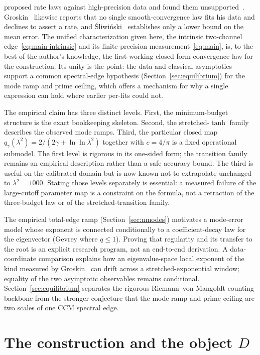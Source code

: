\documentclass[11pt,a4paper]{article}
\begin{document}
\begin{enumerate}
  proposed rate laws against high-precision data and found them
  unsupported~\cite{AndrewsB}. Groskin~\cite{Groskin2026} likewise reports
  that no single smooth-convergence law fits his data and declines to assert a
  rate, and \'Sliwi\'nski~\cite{Sliwinski2026} establishes only a lower bound
  on the mean error. The unified characterization given here, the intrinsic
  two-channel edge~\eqref{eq:main-intrinsic} and its finite-precision
  measurement~\eqref{eq:main}, is, to the best of the author's knowledge, the
  first working closed-form convergence law for the construction. Its unity is
  the point: the data and classical asymptotics support a common spectral-edge
  hypothesis (Section~\ref{sec:equilibrium}) for the mode ramp and prime
  ceiling, which offers a mechanism for why a single expression can hold where
  earlier per-fits could not.
\end{enumerate}

The empirical claim has three distinct levels. First, the minimum-budget
structure is the exact bookkeeping skeleton. Second, the stretched-$\tanh$
family describes the observed mode ramps. Third, the particular closed map
$q_\gamma(\lambda^2)=2/(2\gamma+\ln\ln\lambda^2)$ together with
$c=4/\pi$ is a fixed operational submodel. The first level is rigorous in its one-sided form; the transition family
remains an empirical description rather than a safe accuracy bound. The
third is useful on the calibrated domain but
is now known not to extrapolate unchanged to $\lambda^2=1000$. Stating those
levels separately is essential: a measured failure of the large-cutoff
parameter map is a constraint on the formula, not a retraction of the
three-budget law or of the stretched-transition family.

The empirical total-edge ramp (Section~\ref{sec:nmodes}) motivates a
mode-error model whose exponent is connected conditionally to a
coefficient-decay law for the eigenvector (Gevrey where $q\le1$). Proving that
regularity and its transfer to the
root is an explicit research program, not an end-to-end derivation. A
data-coordinate comparison explains how an eigenvalue-space local exponent of
the kind measured by Groskin~\cite{Groskin2026} can drift across a
stretched-exponential window; equality of the two asymptotic observables remains
conditional. Section~\ref{sec:equilibrium}
separates the rigorous Riemann--von Mangoldt counting backbone from the stronger
conjecture that the mode ramp and prime ceiling are two scales of one CCM
spectral edge.

\section{The construction and the object $D$}\label{sec:background}
\end{document}
